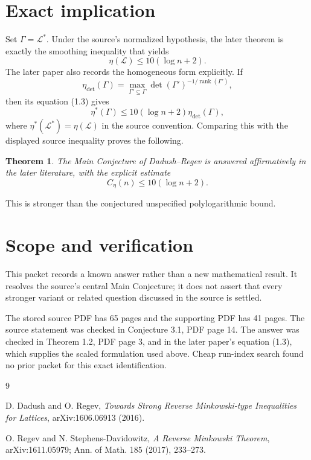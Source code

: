 \documentclass[11pt]{article}
\newtheorem*{theorem}{Theorem}
\newcommand{\Lcal}{\mathcal{L}}
\begin{document}
\section*{Exact implication}

Set $\Gamma=\Lcal^*$.  Under the source's normalized hypothesis, the later
theorem is
exactly the smoothing inequality that yields
\[
 \eta(\Lcal)\le 10(\log n+2).
\]
The later paper also records the homogeneous form explicitly.  If
\[
 \eta_{\det}(\Gamma)
 =\max_{\Gamma'\subseteq\Gamma}
   \det(\Gamma')^{-1/\operatorname{rank}(\Gamma')},
\]
then its equation (1.3) gives
\[
 \eta^*(\Gamma)
 \le 10(\log n+2)\eta_{\det}(\Gamma),
\]
where $\eta^*(\Lcal^*)=\eta(\Lcal)$ in the source convention.  Comparing
this with the displayed source inequality proves the following.

\begin{theorem}
The Main Conjecture of Dadush--Regev is answered affirmatively in the later
literature, with the explicit estimate
\[
 C_\eta(n)\le10(\log n+2).
\]
\end{theorem}

This is stronger than the conjectured unspecified polylogarithmic bound.

\section*{Scope and verification}

This packet records a known answer rather than a new mathematical result.
It resolves the source's central Main Conjecture; it does not assert that
every stronger variant or related question discussed in the source is
settled.

The stored source PDF has 65 pages and the supporting PDF has 41 pages.
The source statement was checked in Conjecture 3.1, PDF page 14.  The answer
was checked in Theorem 1.2, PDF page 3, and in the later paper's equation
(1.3), which supplies the scaled formulation used above.  Cheap run-index
search found no prior packet for this exact identification.

\begin{thebibliography}{9}

D. Dadush and O. Regev,
\emph{Towards Strong Reverse Minkowski-type Inequalities for Lattices},
arXiv:1606.06913 (2016).

O. Regev and N. Stephens-Davidowitz,
\emph{A Reverse Minkowski Theorem},
arXiv:1611.05979; Ann. of Math. 185 (2017), 233--273.

\end{thebibliography}
\end{document}

